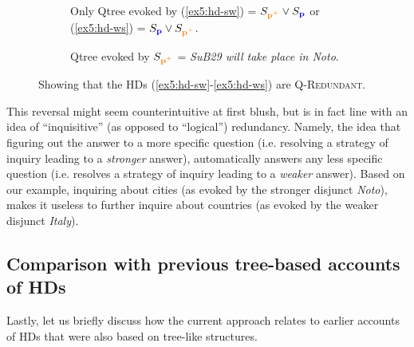 \begin{figure}[H]
	\centering
	\begin{subfigure}[b]{.45\linewidth}
		\centering
		\caption[]{Only Qtree evoked by (\ref{ex5:hd-sw}) = $S_{\textbf{\textcolor{orange}{p$^+$}}} \vee S_{\textbf{\textcolor{blue}{p}}}$ or (\ref{ex5:hd-ws}) = $S_{\textbf{\textcolor{blue}{p}}} \vee S_{\textbf{\textcolor{orange}{p$^+$}}}$.}
		\label{fig5:qtree-noto-or-italy-rr}
	\end{subfigure}
	\hfill
	\begin{subfigure}[b]{.45\linewidth}
		\centering
		\caption[]{Qtree evoked by $S_{\textbf{\textcolor{orange}{p$^+$}}}$ = \textit{SuB29 will take place in Noto}.}\label{fig5:qtree-noto-tiered-rrr}
	\end{subfigure}
	\caption[]{Showing that the HDs (\ref{ex5:hd-sw}-\ref{ex5:hd-ws}) are \textsc{Q-Redundant}.}
\end{figure} 

This reversal might seem counterintuitive at first blush, but is in fact line with an idea of ``inquisitive''  (as opposed to ``logical'') redundancy. Namely, the idea that figuring out the answer to a more specific question (i.e. resolving a strategy of inquiry leading to a \textit{stronger} answer), automatically answers any less specific question (i.e. resolves a strategy of inquiry leading to a \textit{weaker} answer). Based on our example, inquiring about cities (as evoked by the stronger disjunct \textit{Noto}), makes it useless to further inquire about countries (as evoked by the weaker disjunct \textit{Italy}).

\subsection{Comparison with previous tree-based accounts of HDs}
Lastly, let us briefly discuss how the current approach relates to earlier accounts of HDs that were also based on tree-like structures.\\

